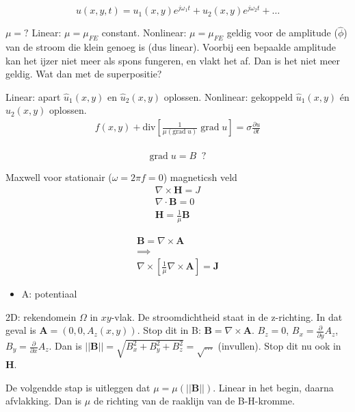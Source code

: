 \begin{equation*}
    u(x,y,t) = u_1(x,y) e^{j\omega_1 t} + u_2(x,y) e^{j\omega_2 t} + \dots
\end{equation*}

$\mu = ?$ Linear: $\mu = \mu_{FE}$ constant. Nonlinear: $\mu = \mu_{FE}$ geldig voor de amplitude ($\hat \phi$) van de stroom die klein genoeg is (dus linear). Voorbij een bepaalde amplitude kan het ijzer niet meer als spons fungeren, en vlakt het af. Dan is het niet meer geldig. Wat dan met de superpositie?

Linear: apart $\hat u_1(x,y)$ en $\hat u_2(x,y)$ oplossen. Nonlinear: gekoppeld $\hat u_1(x,y)$ én $\hat u_2(x,y)$ oplossen.
\begin{align*}
    f(x,y)+\text{div}\left[\frac{1}{\mu(\text{grad}\;u)} \;\text{grad}\;u\right] = \sigma \frac{\partial u}{\partial t} \\
\end{align*}

\begin{equation*}
    \text{grad} \; u = B \;\; ?
\end{equation*}

Maxwell voor stationair ($\omega = 2\pi f = 0$) magneticsh veld
\begin{align*}
    \nabla \times \mathbf H = J \\
    \nabla \cdot \mathbf B = 0 \\
    \mathbf H = \frac{1}{\mu} \mathbf B
\end{align*}

\begin{align*}
    \mathbf B = \nabla \times \mathbf A \\
    \implies \\
    \nabla \times \left[\frac{1}{\mu}\nabla \times \mathbf A\right] = \mathbf J
\end{align*}

\begin{itemize}
    \item A: potentiaal
\end{itemize}


2D: rekendomein $\Omega$ in $xy$-vlak. De stroomdichtheid staat in de z-richting. In dat geval is $\mathbf A = (0, 0, A_z(x,y))$. Stop dit in B: $\mathbf B = \nabla \times \mathbf A$. $B_z = 0$, $B_x = \frac{\partial}{\partial y}A_z$, $B_y = \frac{\partial}{\partial x}A_z$. Dan is $||\mathbf B|| = \sqrt{B_x^2 + B_y^2 + B_z^2} = \sqrt{\dots}$ (invullen). Stop dit nu ook in $\mathbf H$.

De volgendde stap is uitleggen dat $\mu = \mu\left(||\mathbf B ||\right)$. Linear in het begin, daarna afvlakking. Dan is $\mu$ de richting van de raaklijn van de B-H-kromme.